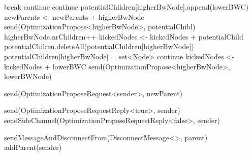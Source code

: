 \begin{algorithm}
\begin{algorithmic}[1]
        \State break
        \EndIf
        \State continue
        \EndIf
        \State continue
        \EndIf
        \State potentialChildren[higherBwNode].append(lowerBWC)
        \State newParents <- newParents + higherBwNode
        \State send(OptimizationPropose<higherBwNode>, potentialChild)
        \State higherBwNode.nrChildren++
        \State kickedNodes <- kickedNodes + potentialChild
        \EndFor
        \State potentialChilren.deleteAll(potentialChildren[higherBwNode])
        \EndFor
        \State potentialChildren[higherBwNode] = set<Node>
        \State continue
        \EndIf
        \EndIf
        \State kickedNodes <- kickedNodes + lowerBWC
        \State send(OptimizationPropose<higherBwNode>, lowerBWNode)
        \EndFor
        \asdend

        \State send(OptimizationProposeRequest<sender>, newParent)
        \EndIf
        \asdend

         
        \State send(OptimizationProposeRequestReply<true>, sender)
        \Else
        \State sendSideChannel(OptimizationProposeRequestReply<false>, sender)
        \EndIf
        \asdend

        \State sendMessageAndDisconnectFrom(DisconnectMessage<>, parent)
        \State addParent(sender)
        \EndIf
        \asdend

    \end{algorithmic}
\end{algorithm}